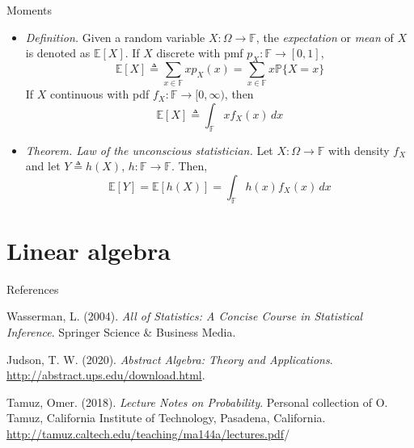 \documentclass{beamer}
\numberwithin{equation}{section}
\begin{document}
\begin{frame}{Moments}
    \begin{itemize}
        \item
        \textit{Definition.} Given a random variable
        $ X : \Omega \rightarrow \mathbb{F} $, the \textit{expectation} or
        \textit{mean} of $ X $ is denoted as $ \mathbb{E}[X] $. If $ X $
        discrete with pmf $ p_X : \mathbb{F} \rightarrow [0, 1] $,
        \begin{equation*}
            \mathbb{E}[X] \triangleq \sum_{x \in \mathbb{F}}xp_X(x) =
            \sum_{x \in \mathbb{F}}x\mathbb{P}\{X = x\}
        \end{equation*}
        If $ X $ continuous with pdf
        $ f_X : \mathbb{F} \rightarrow [0, \infty) $, then
        \begin{equation*}
            \mathbb{E}[X] \triangleq \int_\mathbb{F}xf_X(x)\,dx
        \end{equation*}

        \item
        \textit{Theorem. Law of the unconscious statistician.} Let
        $ X : \Omega \rightarrow \mathbb{F} $ with
        density\footnotemark{} $ f_X $ and let
        $ Y \triangleq h(X) $, $ h : \mathbb{F} \rightarrow \mathbb{F} $. Then,
        \begin{equation*}
            \mathbb{E}[Y] = \mathbb{E}[h(X)] = \int_\mathbb{F}h(x)f_X(x)\,dx
        \end{equation*}
    \end{itemize}

    \medskip

\end{frame}

\section{Linear algebra}

\begin{frame}{References}
    \begin{thebibliography}{99}
        Wasserman, L. (2004). \textit{All of Statistics: A Concise Course in
        Statistical Inference}. Springer Science \& Business Media.

        Judson, T. W. (2020). \textit{Abstract Algebra: Theory and
        Applications}. \url{http://abstract.ups.edu/download.html}.

        Tamuz, Omer. (2018). \textit{Lecture Notes on Probability}. Personal
        collection of O. Tamuz, California Institute of Technology, Pasadena,
        California.
        \url{http://tamuz.caltech.edu/teaching/ma144a/lectures.pdf}/        
    \end{thebibliography}
\end{frame}
\end{document}
